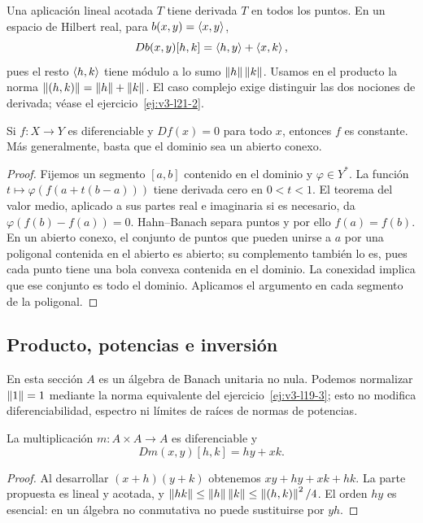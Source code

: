 \begin{ejemplo}
Una aplicación lineal acotada $T$ tiene derivada $T$ en todos los puntos. En un espacio de Hilbert real, para $b(x,y)=\left\langle x,y\right\rangle$,
\[
 Db(x,y)[h,k]=\left\langle h,y\right\rangle+\left\langle x,k\right\rangle,
\]
pues el resto $\left\langle h,k\right\rangle$ tiene módulo a lo sumo $\left\lVert h\right\rVert\left\lVert k\right\rVert$. Usamos en el producto la norma $\left\lVert(h,k)\right\rVert=\left\lVert h\right\rVert+\left\lVert k\right\rVert$. El caso complejo exige distinguir las dos nociones de derivada; véase el ejercicio~\ref{ej:v3-l21-2}.
\end{ejemplo}

\begin{proposicion}
Si $f:X\to Y$ es diferenciable y $Df(x)=0$ para todo $x$, entonces $f$ es constante. Más generalmente, basta que el dominio sea un abierto conexo.
\end{proposicion}
\begin{proof}
Fijemos un segmento $[a,b]$ contenido en el dominio y $\varphi\in Y^*$. La función $t\mapsto\varphi(f(a+t(b-a)))$ tiene derivada cero en $0<t<1$. El teorema del valor medio, aplicado a sus partes real e imaginaria si es necesario, da $\varphi(f(b)-f(a))=0$. Hahn--Banach separa puntos y por ello $f(a)=f(b)$. En un abierto conexo, el conjunto de puntos que pueden unirse a $a$ por una poligonal contenida en el abierto es abierto; su complemento también lo es, pues cada punto tiene una bola convexa contenida en el dominio. La conexidad implica que ese conjunto es todo el dominio. Aplicamos el argumento en cada segmento de la poligonal.
\end{proof}

\subsection{Producto, potencias e inversión}
En esta sección $A$ es un álgebra de Banach unitaria no nula. Podemos normalizar $\left\lVert1\right\rVert=1$ mediante la norma equivalente del ejercicio~\ref{ej:v3-l19-3}; esto no modifica diferenciabilidad, espectro ni límites de raíces de normas de potencias.

\begin{proposicion}\label{v3:derivada-producto}
La multiplicación $m:A\times A\to A$ es diferenciable y
\[
 Dm(x,y)[h,k]=hy+xk.
\]
\end{proposicion}
\begin{proof}
Al desarrollar $(x+h)(y+k)$ obtenemos $xy+hy+xk+hk$. La parte propuesta es lineal y acotada, y $\left\lVert hk\right\rVert\le\left\lVert h\right\rVert\left\lVert k\right\rVert\le\left\lVert(h,k)\right\rVert^2/4$. El orden $hy$ es esencial: en un álgebra no conmutativa no puede sustituirse por $yh$.
\end{proof}


